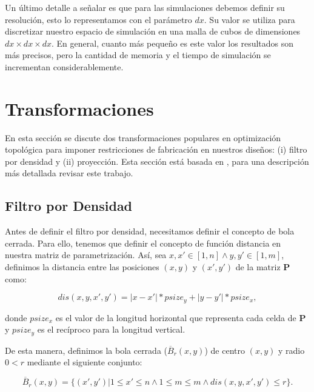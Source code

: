 Un último detalle a señalar es que para las simulaciones debemos definir su resolución,
esto lo representamos con el parámetro $dx$. 
Su valor se utiliza para discretizar nuestro espacio de
simulación en una malla de cubos de dimensiones $dx \times dx \times dx$.
En general, cuanto más pequeño es este valor
los resultados son más precisos, pero la cantidad de memoria y el tiempo de
simulación se incrementan considerablemente.

\section{Transformaciones}\label{sec:transformations}

En esta sección se discute dos transformaciones populares en optimización topológica
para imponer restricciones de fabricación en nuestros diseños: (i) filtro por densidad y
(ii) proyección.
Esta sección está basada en \cite{Lazarov2016}, para una descripción más detallada revisar este trabajo.

\subsection{Filtro por Densidad}

Antes de definir el filtro por densidad, necesitamos definir el concepto de bola cerrada.
Para ello, tenemos que definir el concepto de función distancia en nuestra matriz
de parametrización. Así, sea $x, x' \in [1, n] \land y, y' \in [1, m]$, definimos 
la distancia entre las posiciones $(x, y)$ y $(x', y')$ de la matriz $\boldsymbol{P}$ como:

\begin{equation}
  dis(x, y, x', y') = |x-x'|*psize_y+|y-y'|*psize_x,
  \label{eq:distance}
\end{equation}

\noindent donde $psize_x$ es el valor de la longitud horizontal que representa cada celda de $\boldsymbol{P}$
y $psize_y$ es el recíproco para la longitud vertical. 

De esta manera, definimos la bola cerrada ($\overline{B}_{r}(x, y)$)  de centro $(x, y)$ y 
radio $0 < r$ mediante el siguiente conjunto:

\begin{equation}
  \overline{B}_{r}(x, y) = \{(x', y') | 1 \leq x' \leq n \land 1 \leq m \leq m \land 
  dis(x, y, x', y') \leq r\}.
  \label{eq:bola}
\end{equation}

